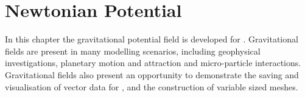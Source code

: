 
%
%
%

\section{Newtonian Potential}

In this chapter the gravitational potential field is developed for \esc.
Gravitational fields are present in many modelling scenarios, including
geophysical investigations, planetary motion and attraction and micro-particle
interactions. Gravitational fields also present an opportunity to demonstrate
the saving and visualisation of vector data for \mayavi, and the construction of
variable sized meshes.

